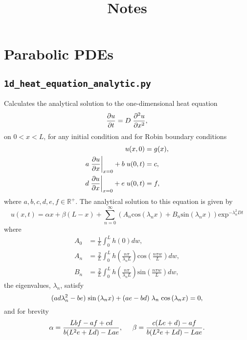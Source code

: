 \documentclass{article}
\begin{document}
\title{Notes}

\section{Parabolic PDEs}

\subsection{\texttt{1d\_heat\_equation\_analytic.py}}
Calculates the analytical solution to the one-dimensional heat equation
\begin{equation*}
\frac{\partial u}{\partial t} = D \hspace{0.1cm} \frac{\partial^2 u}{\partial x^2},
\end{equation*}
on $0 < x < L$, for any initial condition and for Robin boundary conditions
\begin{align*}
u(x,0)&=g(x),\\
a \hspace{0.1cm}\frac{\partial u}{\partial x}\bigg|_{x=0} + b \hspace{0.1cm} u(0,t) &= c, \\
d \hspace{0.1cm}\frac{\partial u}{\partial x}\bigg|_{x=0} + e \hspace{0.1cm} u(0,t) &= f,
\end{align*}
where $a,b,c,d,e,f \in \mathbb{R}^{+} $. The analytical solution to this equation is given by
\begin{equation*}
u(x,t)=\alpha x + \beta (L - x) + \sum_{n=0}^{\infty} \left( A_n \mathrm{cos}\left( \lambda_n x \right) + B_n \mathrm{sin}\left( \lambda_n x \right) \right) \mathrm{exp}^{-\lambda_n^2 D t}
\end{equation*}
where
\begin{align*}
A_0 &= \frac{1}{L} \int_0^L h(0) dw, \\
A_n &= \frac{2}{L} \int_0^L h\left( \frac{n \pi}{\lambda_n L} \right) \mathrm{cos} \left( \frac{n \pi w}{L} \right) dw,\\
B_n &= \frac{2}{L} \int_0^L h\left( \frac{n \pi}{\lambda_n L} \right) \mathrm{sin} \left( \frac{n \pi w}{L} \right) dw,
\end{align*}
the eigenvalues, $\lambda_n$, satisfy
\begin{equation*}
(ad\lambda_n^2-be) \hspace{0.1cm} \mathrm{sin}\left( \lambda_n x \right) + (ae-bd) \hspace{0.1cm} \lambda_n \hspace{0.1cm} \mathrm{cos}\left( \lambda_n x \right) = 0,
\end{equation*}
and for brevity
\begin{equation*}
\alpha=\frac{Lbf-af+cd}{b(L^2e+Ld)-Lae}, \hspace{0.5cm} \beta=\frac{c(Le+d)-af}{b(L^2e+Ld)-Lae}.
\end{equation*}
\end{document}

